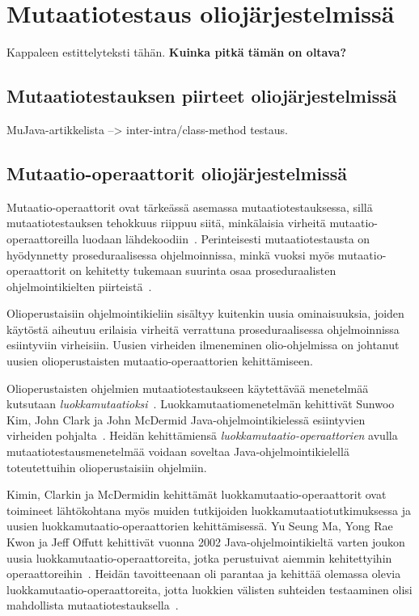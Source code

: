 \documentclass[finnish, grading]{tktltiki2}
\theoremstyle{definition}
\theoremstyle{remark}
\begin{document}
\section{Mutaatiotestaus oliojärjestelmissä}

Kappaleen estittelyteksti tähän. \textbf{Kuinka pitkä tämän on oltava?} 

\subsection{Mutaatiotestauksen piirteet oliojärjestelmissä}

MuJava-artikkelista --> inter-intra/class-method testaus.

\subsection{Mutaatio-operaattorit oliojärjestelmissä}

Mutaatio-operaattorit ovat tärkeässä asemassa mutaatiotestauksessa, sillä mutaatiotestauksen tehokkuus riippuu siitä, minkälaisia virheitä mutaatio-operaattoreilla luodaan lähdekoodiin~\cite[s. 352]{Ma:Kwon:Offutt:2002}. Perinteisesti mutaatiotestausta on hyödynnetty proseduraalisessa ohjelmoinnissa, minkä vuoksi myös mutaatio-operaattorit on kehitetty tukemaan suurinta osaa proseduraalisten ohjelmointikielten piirteistä~\cite[s. 352]{Ma:Kwon:Offutt:2002}. 

Olioperustaisiin ohjelmointikieliin sisältyy kuitenkin uusia ominaisuuksia, joiden käytöstä aiheutuu erilaisia virheitä verrattuna proseduraalisessa ohjelmoinnissa esiintyviin virheisiin. Uusien virheiden ilmeneminen olio-ohjelmissa on johtanut uusien olioperustaisten mutaatio-operaattorien kehittämiseen.  

Olioperustaisten ohjelmien mutaatiotestaukseen käytettävää menetelmää kutsutaan \textit{luokkamutaatioksi}~\cite{Kim:Clark:McDermid:2000}. Luokkamutaatiomenetelmän kehittivät Sunwoo Kim, John Clark ja John McDermid Java-oh\-jel\-moin\-ti\-kie\-les\-sä esiintyvien virheiden pohjalta~\cite{Kim:Clark:McDermid:2000}. Heidän kehittämiensä \textit{luokkamutaatio-operaattorien} avulla mutaatiotestausmenetelmää voidaan soveltaa Java-ohjelmointikielellä toteutettuihin olioperustaisiin ohjelmiin.

Kimin, Clarkin ja McDermidin kehittämät luokkamutaatio-operaattorit ovat toimineet lähtökohtana myös muiden tutkijoiden luokkamutaatiotutkimuksessa ja uusien luokkamutaatio-operaattorien kehittämisessä. Yu Seung Ma, Yong Rae Kwon ja Jeff Offutt kehittivät vuonna 2002 Java-oh\-jel\-moin\-ti\-kiel\-tä varten joukon uusia luokkamutaatio-operaattoreita, jotka perustuivat aiemmin kehitettyihin operaattoreihin~\cite[s. 352]{Ma:Kwon:Offutt:2002}. Heidän tavoitteenaan oli parantaa ja kehittää olemassa olevia luokkamutaatio-operaattoreita, jotta luokkien välisten suhteiden testaaminen olisi mahdollista mutaatiotestauksella~\cite[s. 362]{Ma:Kwon:Offutt:2002}.
\end{document}
